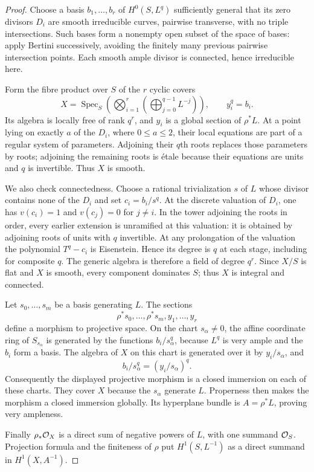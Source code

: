 \begin{proof}
Choose a basis $b_1,\ldots,b_r$ of $H^0(S,L^q)$ sufficiently general that its zero divisors $D_i$ are smooth irreducible curves, pairwise transverse, with no triple intersections.  Such bases form a nonempty open subset of the space of bases: apply Bertini successively, avoiding the finitely many previous pairwise intersection points.  Each smooth ample divisor is connected, hence irreducible here.

Form the fibre product over $S$ of the $r$ cyclic covers
\[
 X=\operatorname{Spec}_S\left(
  \bigotimes_{i=1}^r\left(\bigoplus_{j=0}^{q-1}L^{-j}\right)\right),
 \qquad y_i^q=b_i.
\]
Its algebra is locally free of rank $q^r$, and $y_i$ is a global section of $\rho^*L$.  At a point lying on exactly $a$ of the $D_i$, where $0\leq a\leq2$, their local equations are part of a regular system of parameters.  Adjoining their $q$th roots replaces those parameters by roots; adjoining the remaining roots is \'etale because their equations are units and $q$ is invertible.  Thus $X$ is smooth.

We also check connectedness.  Choose a rational trivialization $s$ of $L$ whose divisor contains none of the $D_i$ and set $c_i=b_i/s^q$.  At the discrete valuation of $D_i$, one has $v(c_i)=1$ and $v(c_j)=0$ for $j\ne i$.  In the tower adjoining the roots in order, every earlier extension is unramified at this valuation: it is obtained by adjoining roots of units with $q$ invertible.  At any prolongation of the valuation the polynomial $T^q-c_i$ is Eisenstein.  Hence its degree is $q$ at each stage, including for composite $q$.  The generic algebra is therefore a field of degree $q^r$.  Since $X/S$ is flat and $X$ is smooth, every component dominates $S$; thus $X$ is integral and connected.

Let $s_0,\ldots,s_m$ be a basis generating $L$.  The sections
\[
                 \rho^*s_0,\ldots,\rho^*s_m,y_1,\ldots,y_r
\]
define a morphism to projective space.  On the chart $s_\alpha\ne0$, the affine coordinate ring of $S_{s_\alpha}$ is generated by the functions $b_i/s_\alpha^q$, because $L^q$ is very ample and the $b_i$ form a basis.  The algebra of $X$ on this chart is generated over it by $y_i/s_\alpha$, and
\[
             b_i/s_\alpha^q=(y_i/s_\alpha)^q.
\]
Consequently the displayed projective morphism is a closed immersion on each of these charts.  They cover $X$ because the $s_\alpha$ generate $L$.  Properness then makes the morphism a closed immersion globally.  Its hyperplane bundle is $A=\rho^*L$, proving very ampleness.

Finally $\rho_*\mathcal O_X$ is a direct sum of negative powers of $L$, with one summand $\mathcal O_S$.  Projection formula and the finiteness of $\rho$ put $H^1(S,L^{-1})$ as a direct summand in $H^1(X,A^{-1})$.
\end{proof}

